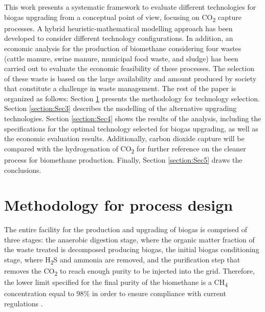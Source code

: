 \begin{refsection}[referencesCh7]
This work presents a systematic framework to evaluate different technologies for biogas upgrading from a conceptual point of view,
focusing on CO\textsubscript{2} capture processes. A hybrid heuristic-mathematical modelling approach has been developed to
consider different technology configurations. In addition, an economic analysis for the production of biomethane considering four
wastes (cattle manure, swine manure, municipal food waste, and sludge) has been carried out to evaluate the economic feasibility of these processes. The selection of these waste is based on the large availability and amount produced by society that constitute a challenge in waste management. The rest of the paper is organized as follows: Section \ref{section:Sec2} presents the methodology for technology selection. Section \ref{section:Sec3} describes the modelling of the alternative upgrading technologies. Section \ref{section:Sec4} shows the results of the analysis, including the specifications for the optimal technology selected for biogas upgrading, as well as the economic evaluation results. Additionally, carbon dioxide capture will be compared with the hydrogenation of CO\textsubscript{2} for further reference on the cleaner process for biomethane production. Finally, Section \ref{section:Sec5} draws the conclusions.


\section{Methodology for process design}\label{section:Sec2}
The entire facility for the production and upgrading of biogas is comprised of three stages: the anaerobic digestion stage, where the organic matter fraction of the waste treated is decomposed producing biogas, the initial biogas conditioning stage, where H\textsubscript{2}S and ammonia are removed, and the purification step that removes the CO\textsubscript{2} to reach enough purity to be injected into the grid. Therefore, the lower limit specified for the final purity of the biomethane is a CH\textsubscript{4} concentration equal to 98\% in order to ensure compliance with current regulations \citet{SpanishMinistryofIndustry}.


\end{refsection}
